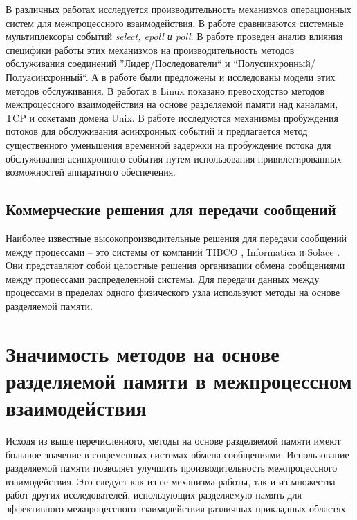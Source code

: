 В различных работах исследуется производительность механизмов операционных систем для межпроцессного взаимодействия. В работе \cite{MuxComparison} сравниваются системные мультиплексоры событий \textit{select, epoll и poll}. В работе \cite{AnalysisOfEventProcDesignPatterns} проведен анализ влияния специфики работы этих механизмов на производительность методов обслуживания соединений ''Лидер/Последователи`` и ``Полусинхронный/Полуасинхронный``. А в работе \cite{6298185} были предложены и исследованы модели этих методов обслуживания.
В работах \cite{Smith2012DraftH, venkataraman2015evaluation} в Linux показано превосходство методов межпроцессного взаимодействия на основе разделяемой памяти над каналами, TCP и сокетами домена Unix.
В работе \cite{8526899} исследуются механизмы пробуждения потоков для обслуживания асинхронных событий и предлагается метод существенного уменьшения временной задержки на пробуждение потока для обслуживания асинхронного события путем использования привилегированных возможностей аппаратного обеспечения.

\subsection{Коммерческие решения для передачи сообщений}

Наиболее известные высокопроизводительные решения для передачи сообщений между процессами -- это системы от компаний TIBCO \cite{TIBCO}, Informatica \cite{Informatica} и Solace \cite{Solace}. Они представляют собой целостные решения организации обмена сообщениями между процессами распределенной системы. Для передачи данных между процессами в пределах одного физического узла используют методы на основе разделяемой памяти.

\section{Значимость методов на основе разделяемой памяти в межпроцессном взаимодействия}

Исходя из выше перечисленного, методы на основе разделяемой памяти имеют большое значение в современных системах обмена сообщениями. Использование разделяемой памяти позволяет улучшить производительность межпроцессного взаимодействия. Это следует как из ее механизма работы, так и из множества работ других исследователей, использующих разделяемую память для эффективного межпроцессного взаимодействия различных прикладных областях.

